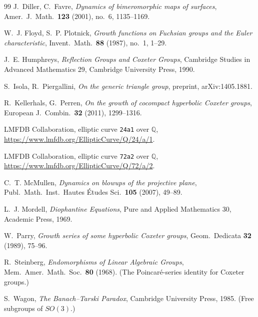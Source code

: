 \documentclass[11pt,a4paper]{article}
\newcommand{\Q}{\mathbb{Q}}
\theoremstyle{definition}
\theoremstyle{remark}
\theoremstyle{plain}
\begin{document}
\begin{thebibliography}{99}
J.~Diller, C.~Favre, \emph{Dynamics of bimeromorphic maps of surfaces}, Amer.\ J.\ Math.\
\textbf{123} (2001), no.~6, 1135--1169.

W.~J. Floyd, S.~P. Plotnick, \emph{Growth functions on Fuchsian groups and the Euler
characteristic}, Invent.\ Math.\ \textbf{88} (1987), no.~1, 1--29.

J.~E. Humphreys, \emph{Reflection Groups and Coxeter Groups}, Cambridge Studies in Advanced
Mathematics 29, Cambridge University Press, 1990.

S.~Isola, R.~Piergallini, \emph{On the generic triangle group}, preprint, arXiv:1405.1881.

R.~Kellerhals, G.~Perren, \emph{On the growth of cocompact hyperbolic Coxeter groups},
European J.\ Combin.\ \textbf{32} (2011), 1299--1316.

LMFDB Collaboration, elliptic curve \texttt{24a1} over $\Q$,
\url{https://www.lmfdb.org/EllipticCurve/Q/24/a/1}.

LMFDB Collaboration, elliptic curve \texttt{72a2} over $\Q$,
\url{https://www.lmfdb.org/EllipticCurve/Q/72/a/2}.

C.~T. McMullen, \emph{Dynamics on blowups of the projective plane}, Publ.\ Math.\ Inst.\ Hautes
\'Etudes Sci.\ \textbf{105} (2007), 49--89.

L.~J. Mordell, \emph{Diophantine Equations}, Pure and Applied Mathematics 30, Academic Press,
1969.

W.~Parry, \emph{Growth series of some hyperbolic Coxeter groups}, Geom.\ Dedicata \textbf{32}
(1989), 75--96.

R.~Steinberg, \emph{Endomorphisms of Linear Algebraic Groups}, Mem.\ Amer.\ Math.\ Soc.\
\textbf{80} (1968). (The Poincar\'e-series identity for Coxeter groups.)

\bibitem{Wagon}
S.~Wagon, \emph{The Banach--Tarski Paradox}, Cambridge University Press, 1985. (Free subgroups
of $SO(3)$.)

\end{thebibliography}
\end{document}
